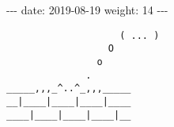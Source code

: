 -\/-\/- date: 2019-08-19 weight: 14 -\/-\/-

\begin{verbatim}
                    ( ... )
                  O
                o
              .
_____,,,_^..^_,,,_____
__|____|____|____|____
____|____|____|____|__
\end{verbatim}
